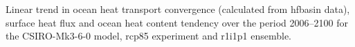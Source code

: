\label{fig:csiro_full}
Linear trend in ocean heat transport convergence (calculated from hfbasin data), surface heat flux and ocean heat content tendency over the period 2006--2100 for the CSIRO-Mk3-6-0 model, rcp85 experiment and r1i1p1 ensemble.